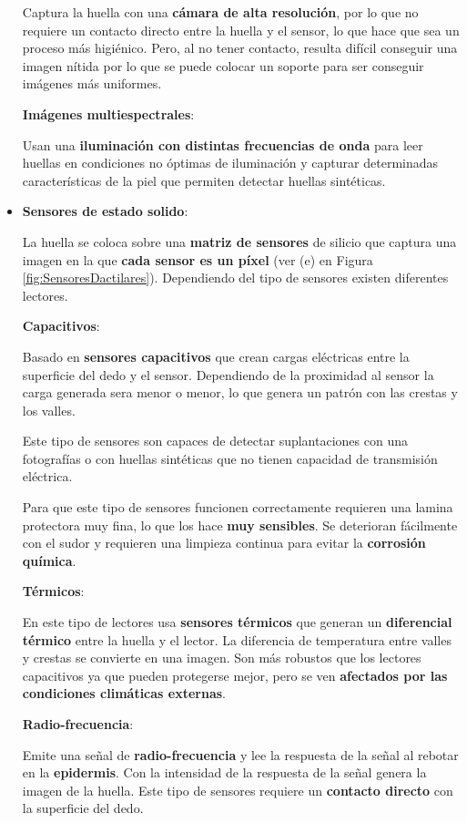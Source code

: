 \begin{itemize}
    Captura la huella con una \textbf{cámara de alta resolución}, por lo que no requiere un contacto directo entre la huella y el sensor, lo que hace que sea un proceso más higiénico. Pero, al no tener contacto, resulta difícil conseguir una imagen nítida por lo que se puede colocar un soporte para ser conseguir imágenes más uniformes. 
    
    \textbf{Imágenes multiespectrales}:
    
    Usan una \textbf{iluminación con distintas frecuencias de onda} para leer huellas en condiciones no óptimas de iluminación y capturar determinadas características de la piel que permiten detectar huellas sintéticas.
    
    \item
    \textbf{Sensores de estado solido}:
    
    La huella se coloca sobre una \textbf{matriz de sensores} de silicio que captura una imagen en la que \textbf{cada sensor es un píxel} (ver (e) en Figura \ref{fig:SensoresDactilares}). Dependiendo del tipo de sensores existen diferentes lectores.
    
    \textbf{Capacitivos}:
    
    Basado en \textbf{sensores capacitivos} que crean cargas eléctricas entre la superficie del dedo y el sensor. Dependiendo de la proximidad al sensor la carga generada sera menor o menor, lo que genera un patrón con las crestas y los valles. 
    
    Este tipo de sensores son capaces de detectar suplantaciones con una fotografías o con huellas sintéticas que no tienen capacidad de transmisión eléctrica.
    
    Para que este tipo de sensores funcionen correctamente requieren una lamina protectora muy fina, lo que los hace \textbf{muy sensibles}. Se deterioran fácilmente con el sudor y requieren una limpieza continua para evitar la \textbf{corrosión química}. 
    
    \textbf{Térmicos}:
    
    En este tipo de lectores usa \textbf{sensores térmicos} que generan un \textbf{diferencial térmico} entre la huella y el lector. La diferencia de temperatura entre valles y crestas se convierte en una imagen.  
    Son más robustos que los lectores capacitivos ya que pueden protegerse mejor, pero se ven \textbf{afectados por las condiciones climáticas externas}.
    
    \textbf{Radio-frecuencia}:
    
    Emite una señal de \textbf{radio-frecuencia} y lee la respuesta de la señal al rebotar en la \textbf{epidermis}. Con la intensidad de la respuesta de la señal genera la imagen de la huella. Este tipo de sensores requiere un \textbf{contacto directo} con la superficie del dedo.  
    

\end{itemize}
